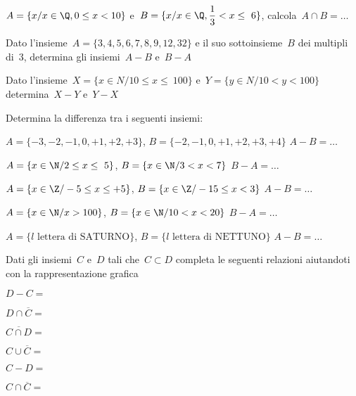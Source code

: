 \begin{esercizio}
\label{ese:7.51}
\(A=\{x/x\in \Q,0\le x<10\}\) e~\(B=\{x/x\in 
\Q,\dfrac{1}{3}<x\le~6\}\), 
calcola~\(A\cap B=\ldots\)
\end{esercizio}

\begin{esercizio}
\label{ese:7.52}
Dato l'insieme~\(A=\{3, 4, 5, 6, 7, 8, 9, 12, 32\}\) e il suo 
sottoinsieme~\(B\) dei 
multipli di~3, determina gli
insiemi~\(A-B\) e~\(B-A\)
\end{esercizio}

\begin{esercizio}
\label{ese:7.53}
Dato l'insieme~\(X=\{x\in N/10\le x\le~100\}\) e~\(Y=\{y\in N/10<y<100\}\) 
determina~\(X-Y\) e~\(Y-X\)
\end{esercizio}

\begin{esercizio}
\label{ese:7.54}
Determina la differenza tra i seguenti insiemi:
\vspace{-6pt}
\begin{enumeratea}
 \item \(A=\{-3,-2,-1,0,+1,+2,+3\}\), \(B=\{-2,-1,0,+1,+2,+3,+4\}\) 
\(A-B=\ldots\)
\item \(A=\{x\in\N/2\le x\le~5\}\), \(B=\{x\in\N/3<x<7\}\) \(B-A=\ldots\)
\item \(A=\{x\in\Z/-5\le x\le +5\}\), \(B=\{x\in\Z/-15\le x<3\}\) 
\(A-B=\ldots\)
\item \(A=\{x\in\N/x>100\}\), \(B=\{x\in \N/10<x<20\}\) \(B-A=\ldots\)
\item \(A=\{l\text{ lettera di SATURNO}\}\), \(B=\{l\text{ lettera di 
NETTUNO}\}\) 
\(A-B=\ldots\)
\end{enumeratea}
\end{esercizio}

\newpage %

\begin{esercizio}
\label{ese:7.55}
Dati gli insiemi~\(C\) e~\(D\) tali che~\(C\subset D\)
completa le seguenti relazioni aiutandoti con la rappresentazione
grafica
\vspace{-6pt}
\begin{multicols}{3}
\begin{enumeratea}
\item \(D-C=\)
\item \(D\cap \overline{C}=\)
\item \(\overline{{C\cap D}}=\)
\item \(C\cup \overline{C}=\)
\item \(C-D=\)
\item \(C\cap \overline{C}=\)
\end{enumeratea}
\end{multicols}
\end{esercizio}

